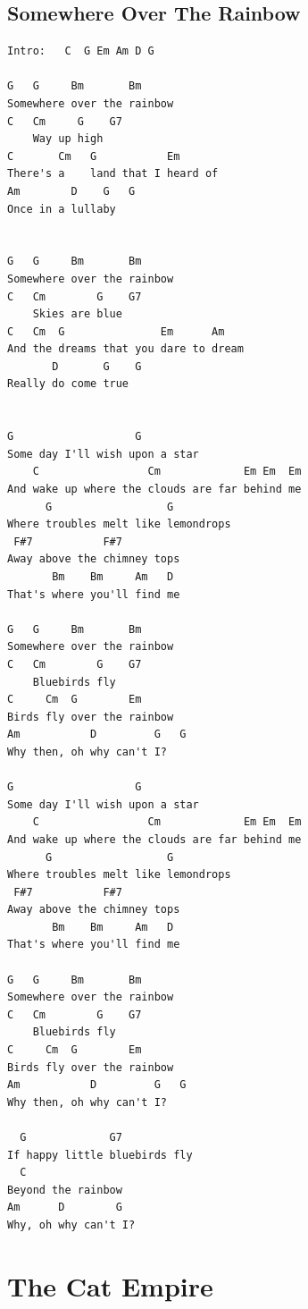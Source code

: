 \documentclass[a4paper]{article}
\begin{document}
\subsection{Somewhere Over The Rainbow} %
\label{sub:Somewhere Over The Rainbow}
\begin{Verbatim}[commandchars=\\\{\}]
Intro:   C  G Em Am D G

G   G     Bm       Bm
Somewhere over the rainbow
C   Cm     G    G7
    Way up high
C       Cm   G           Em
There's a    land that I heard of
Am        D    G   G
Once in a lullaby


G   G     Bm       Bm
Somewhere over the rainbow
C   Cm        G    G7
    Skies are blue
C   Cm  G               Em      Am
And the dreams that you dare to dream
       D       G    G
Really do come true


G                   G
Some day I'll wish upon a star
    C                 Cm             Em Em  Em
And wake up where the clouds are far behind me
      G                  G
Where troubles melt like lemondrops
 F#7           F#7
Away above the chimney tops
       Bm    Bm     Am   D
That's where you'll find me

G   G     Bm       Bm
Somewhere over the rainbow
C   Cm        G    G7
    Bluebirds fly
C     Cm  G        Em
Birds fly over the rainbow
Am           D         G   G
Why then, oh why can't I?

G                   G
Some day I'll wish upon a star
    C                 Cm             Em Em  Em
And wake up where the clouds are far behind me
      G                  G
Where troubles melt like lemondrops
 F#7           F#7
Away above the chimney tops
       Bm    Bm     Am   D
That's where you'll find me

G   G     Bm       Bm
Somewhere over the rainbow
C   Cm        G    G7
    Bluebirds fly
C     Cm  G        Em
Birds fly over the rainbow
Am           D         G   G
Why then, oh why can't I?

  G             G7
If happy little bluebirds fly
  C
Beyond the rainbow
Am      D        G
Why, oh why can't I?
\end{Verbatim}
\newpage
\section{The Cat Empire} %
\label{sec:The Cat Empire}
\end{document}
